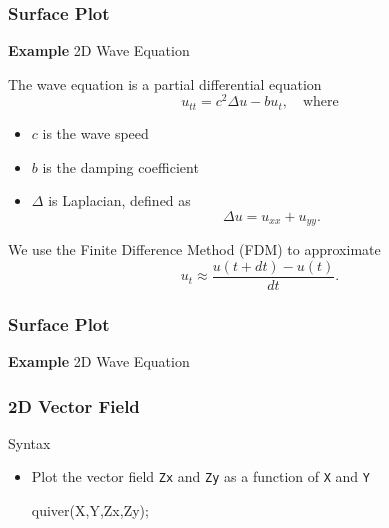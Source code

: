 \documentclass[compress]{beamer}  %
\begin{document}
\begin{frame}[fragile]
\frametitle{Surface Plot}
\textbf{Example} 2D Wave Equation

The wave equation is a partial differential equation
\begin{equation}\label{eq:wave_eq}
   u_{tt} = c^2 \Delta u - b u_t,\quad \mbox{where}
\end{equation}\pause
\begin{itemize}
    \item $c$ is the wave speed
    \item $b$ is the damping coefficient
    \item $\Delta$ is Laplacian, defined as
          \begin{equation}
          \Delta u = u_{xx} + u_{yy}.
          \end{equation}
\end{itemize}
\pause
We use the Finite Difference Method (FDM) to approximate
\begin{equation}
    u_t \approx \frac{u(t+dt) - u(t)}{dt}.
\end{equation}

\end{frame}
\begin{frame}[fragile]
\frametitle{Surface Plot}
\textbf{Example} 2D Wave Equation

\setcounter{subfigure}{0}
\begin{figure}
    \centering
\end{figure}

\end{frame}
\begin{frame}[fragile]
\frametitle{2D Vector Field}
\begin{block}{Syntax}
\begin{itemize}
    \item Plot the vector field \texttt{Zx} and \texttt{Zy} as a function of \texttt{X} and \texttt{Y}
          \begin{matlabcodebeamer}[numbers=none,frame=none]
          quiver(X,Y,Zx,Zy);
          \end{matlabcodebeamer}
\end{itemize}
\end{block}

\end{frame}
\end{document}
